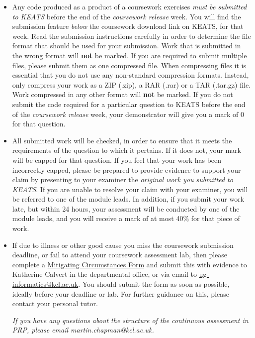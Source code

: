 \documentclass[11pt]{article}
\begin{document}
\begin{itemize}
\item Any code produced as a product of a coursework exercises \emph{must be submitted to KEATS} before the end of the \emph{coursework release} week. You will find the submission feature \emph{below} the coursework download link on KEATS, for that week. Read the submission instructions carefully in order to determine the file format that should be used for your submission. Work that is submitted in the wrong format will \textbf{not} be marked. If you are required to submit multiple files, please submit them as one compressed file. When compressing files it is essential that you do not use any non-standard compression formats. Instead, only compress your work as a ZIP (.zip), a RAR (.rar) or a TAR (.tar.gz) file. Work compressed in any other format will \textbf{not} be marked. If you do not submit the code required for a particular question to KEATS before the end of the \emph{coursework release} week, your demonstrator will give you a mark of 0 for that question.

\item All submitted work will be checked, in order to ensure that it meets the requirements of the question to which it pertains. If it does not, your mark will be capped for that question. If you feel that your work has been incorrectly capped, please be prepared to provide evidence to support your claim by presenting to your examiner the \emph{original work you submitted to KEATS}. If you are unable to resolve your claim with your examiner, you will be referred to one of the module leads. In addition, if you submit your work late, but within 24 hours, your assessment will be conducted by one of the module leads, and you will receive a mark of at most 40\% for that piece of work.

\item If due to illness or other good cause you miss the coursework submission deadline, or fail to attend your coursework assessment lab, then please complete a \href{http://www.kcl.ac.uk/college/policyzone/index.php?id=280}{Mitigating Circumstances Form} and submit this with evidence to Katherine Calvert in the departmental office, or via email to \url{ug-informatics@kcl.ac.uk}. You should submit the form as soon as possible, ideally before your deadline or lab. For further guidance on this, please contact your personal tutor.

\emph{If you have any questions about the structure of the continuous assessment in PRP, please email martin.chapman@kcl.ac.uk.}

\end{itemize}
\end{document}
